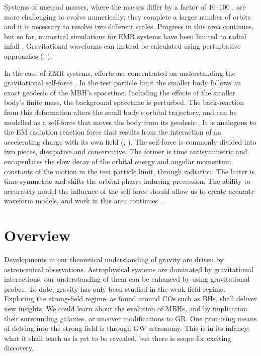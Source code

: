 Systems of unequal masses, where the masses differ by a factor of $10$--$100$ \citep{Lousto2010,Lousto2011}, are more challenging to evolve numerically; they complete a larger number of orbits and it is necessary to resolve two different scales. Progress in this area continues, but so far, numerical simulations for EMR systems have been limited to radial infall \citep{East2012}. Gravitational waveforms can instead be calculated using perturbative approaches (\citealt{Teukolsky1973}; \citealt[chapter 9]{Chandrasekhar1992}).

In the case of EMR systems, efforts are concentrated on understanding the gravitational self-force \citep{Barack2009,Poisson2004}. In the test particle limit the smaller body follows an exact geodesic of the MBH's spacetime. Including the effects of the smaller body's finite mass, the background spacetime is perturbed. The back-reaction from this deformation alters the small body's orbital trajectory, and can be modelled as a self-force that moves the body from its geodesic \citep{Mino1997,Quinn1997,Gralla2008}. It is analogous to the EM radiation reaction force that results from the interaction of an accelerating charge with its own field (\citealt{Dirac1938}; \citealt[sections 16.1--16.3]{Jackson1999}). The self-force is commonly divided into two pieces, dissipative and conservative. The former is time antisymmetric and encapsulates the slow decay of the orbital energy and angular momentum, constants of the motion in the test particle limit, through radiation. The latter is time symmetric and shifts the orbital phases inducing precession. The ability to accurately model the influence of the self-force should allow us to create accurate waveform models, and work in this area continues \citep[e.g.,][]{Pound2012}.

\section{Overview}

Developments in our theoretical understanding of gravity are driven by astronomical observations. Astrophysical systems are dominated by gravitational interactions; our understanding of them can be enhanced by using gravitational probes. To date, gravity has only been studied in the weak-field regime. Exploring the strong-field regime, as found around COs such as BHs, shall deliver new insights. We could learn about the evolution of MBHs, and by implication their surrounding galaxies, or uncover modifications to GR. One promising means of delving into the strong-field is through GW astronomy. This is in its infancy; what it shall teach us is yet to be revealed, but there is scope for exciting discovery.

